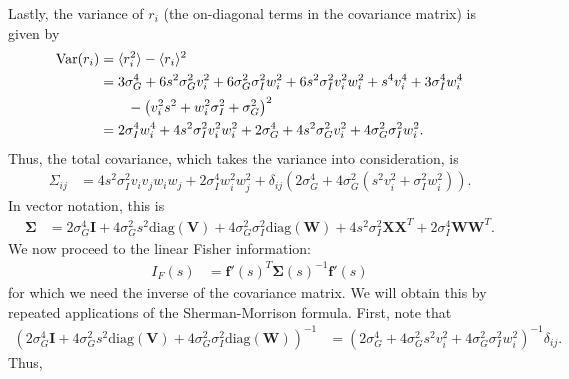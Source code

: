 \documentclass[11pt]{article}
\begin{document}
	Lastly, the variance of $r_i$ (the on-diagonal terms in the covariance matrix) is given by 
	\begin{align}
	\text{Var}(r_i) &= \langle r_i^2 \rangle - \langle r_i\rangle^2 \\
	&= 3\sigma_G^4 + 6s^2\sigma_G^2  v_i^2  +6 \sigma_G^2 \sigma_I^2  w_i^2+  6s^2 \sigma_I^2 v_i^2 w_i^2+ s^4 v_i^4 + 3\sigma_I^4 w_i^4 \notag \\ 
	& \qquad -\left(v_i^2 s^2 + w_i^2 \sigma_I^2 + \sigma_G^2\right)^2 \\
	&= 2\sigma_I^4 w_i^4 + 4s^2 \sigma_I^2 v_i^2 w_i^2 + 2\sigma_G^4 + 4s^2 \sigma_G^2 v_i^2  + 4\sigma_G^2\sigma_I^2 w_i^2.
	\end{align}
	Thus, the total covariance, which takes the variance into consideration, is 
	\begin{align}
	\Sigma_{ij} &= 4 s^2 \sigma_I^2 v_i v_j w_i w_j + 2 \sigma_I^4 w_i^2 w_j^2 + \delta_{ij} \left(2 \sigma_G^4 + 4\sigma_G^2 (s^2 v_i^2 + \sigma_I^2 w_i^2)\right).
	\end{align}
	In vector notation, this is 
	\begin{align}
	\boldsymbol{\Sigma} &= 2\sigma_G^4 \mathbf{I} +4\sigma_G^2 s^2 \text{diag}(\mathbf{V}) + 4\sigma_G^2 \sigma_I^2 \text{diag}(\mathbf{W}) + 4s^2 \sigma_I^2 \mathbf{X}\mathbf{X}^T + 2 \sigma_I^4 \mathbf{W}\mathbf{W}^T.
	\end{align}
	We now proceed to the linear Fisher information:
	\begin{align}
	I_F(s) &= \mathbf{f}'(s)^T \boldsymbol{\Sigma}(s)^{-1} \mathbf{f}'(s)
	\end{align}
	for which we need the inverse of the covariance matrix. We will obtain this by repeated applications of the Sherman-Morrison formula. First, note that 
	\begin{align}
	\left(2\sigma_G^4 \mathbf{I} +4\sigma_G^2 s^2 \text{diag}(\mathbf{V}) + 4\sigma_G^2 \sigma_I^2 \text{diag}(\mathbf{W})\right)^{-1} &= \left(2\sigma_G^4 + 4\sigma_G^2 s^2 v_i^2 + 4\sigma_G^2 \sigma_I^2 w_i^2\right)^{-1}\delta_{ij}.
	\end{align}
	Thus,
\end{document}
